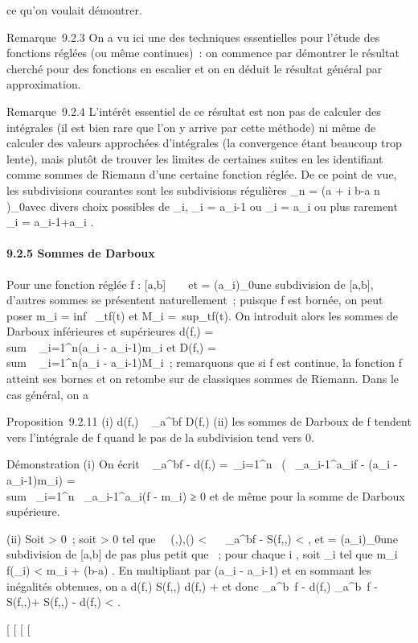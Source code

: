\documentclass[]{article}
\begin{document}
ce qu'on voulait démontrer.

Remarque~9.2.3 On a vu ici une des techniques essentielles pour l'étude
des fonctions réglées (ou même continues)~: on commence par démontrer le
résultat cherché pour des fonctions en escalier et on en déduit le
résultat général par approximation.

Remarque~9.2.4 L'intérêt essentiel de ce résultat est non pas de
calculer des intégrales (il est bien rare que l'on y arrive par cette
méthode) ni même de calculer des valeurs approchées d'intégrales (la
convergence étant beaucoup trop lente), mais plutôt de trouver les
limites de certaines suites en les identifiant comme sommes de Riemann
d'une certaine fonction réglée. De ce point de vue, les subdivisions
courantes sont les subdivisions régulières \sigma_n = (a + i b-a
\over n )_0\leqi\leqn avec divers choix possibles de
\xi_i, \xi_i = a_i-1 ou \xi_i =
a_i ou plus rarement \xi_i =
a_i-1+a_i  .

\paragraph{9.2.5 Sommes de Darboux}

Pour une fonction réglée f : [a,b] \rightarrow~ ~ et \sigma =
(a_i)_0\leqi\leqn une subdivision de [a,b], d'autres
sommes se présentent naturellement~; puisque f est bornée, on peut poser
m_i = inf~
_t\in[a_i-1,a_i]f(t) et M_i
=\
sup_t\in[a_i-1,a_i]f(t). On introduit alors
les sommes de Darboux inférieures et supérieures d(f,\sigma)
= \\sum ~
_i=1^n(a_i - a_i-1)m_i et
D(f,\sigma) = \\sum ~
_i=1^n(a_i - a_i-1)M_i~;
remarquons que si f est continue, la fonction f atteint ses bornes et on
retombe sur de classiques sommes de Riemann. Dans le cas général, on a

Proposition~9.2.11 (i) d(f,\sigma) \leq\int ~
_a^bf \leq D(f,\sigma) (ii) les sommes de Darboux de f tendent
vers l'intégrale de f quand le pas de la subdivision tend vers 0.

Démonstration (i) On écrit \int ~
_a^bf - d(f,\sigma) =\
\sum  _i=1^n~\left
(\int ~
_a_i-1^a_if - (a_i -
a_i-1)m_i\right )
= \\sum~
_i=1^n\int ~
_a_i-1^a_i(f - m_i) ≥ 0 et de
même pour la somme de Darboux supérieure.

(ii) Soit \epsilon > 0~; soit \eta > 0 tel que
\forall~~(\sigma,\xi),\quad \delta(\sigma) < \eta
\rigtharrow~\left \int ~
_a^bf - S(f,\sigma,\xi)\right 
< \epsilon {} , et \sigma =
(a_i)_0\leqi\leqn une subdivision de [a,b] de pas plus
petit que \eta~; pour chaque i \in [1,n], soit \xi_i \in
[a_i-1,a_i] tel que m_i \leq f(\xi_i)
< m_i + \epsilon {}(b-a) . En
multipliant par (a_i - a_i-1) et en sommant les
inégalités obtenues, on a d(f,\sigma) \leq S(f,\sigma,\xi) \leq d(f,\sigma) + \epsilon
\over 2 et donc \left
\int  _a^b~f -
d(f,\sigma)\right \leq\left
\int  _a^b~f -
S(f,\sigma,\xi)\right  + S(f,\sigma,\xi) -
d(f,\sigma) < \epsilon.

[
[
[
[
\end{document}

